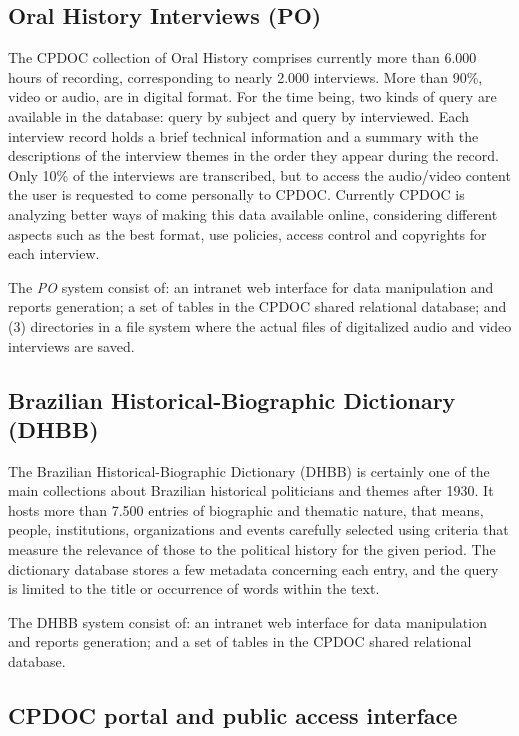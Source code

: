 \documentclass{llncs}
\begin{document}
\subsection{Oral History Interviews (PO)}

The CPDOC collection of Oral History comprises currently more than
6.000 hours of recording, corresponding to nearly 2.000
interviews. More than 90\%, video or audio, are in digital format. For
the time being, two kinds of query are available in the database:
query by subject and query by interviewed. Each interview record holds
a brief technical information and a summary with the descriptions of
the interview themes in the order they appear during the record. Only
10\% of the interviews are transcribed, but to access the audio/video
content the user is requested to come personally to CPDOC. Currently
CPDOC is analyzing better ways of making this data available online,
considering different aspects such as the best format, use policies,
access control and copyrights for each interview.

The \emph{PO} system consist of: an intranet web interface for data
manipulation and reports generation; a set of tables in the CPDOC
shared relational database; and (3) directories in a file system where
the actual files of digitalized audio and video interviews are saved.


\subsection{Brazilian Historical-Biographic Dictionary (DHBB)}

The Brazilian Historical-Biographic Dictionary (DHBB) is certainly one
of the main collections about Brazilian historical politicians and
themes after 1930. It hosts more than 7.500 entries of biographic and
thematic nature, that means, people, institutions, organizations and
events carefully selected using criteria that measure the relevance of
those to the political history for the given period. The dictionary
database stores a few metadata concerning each entry, and the query is
limited to the title or occurrence of words within the text. 

The DHBB system consist of: an intranet web interface for data
manipulation and reports generation; and a set of tables in the CPDOC
shared relational database.


\subsection{CPDOC portal and public access interface}
\end{document}
